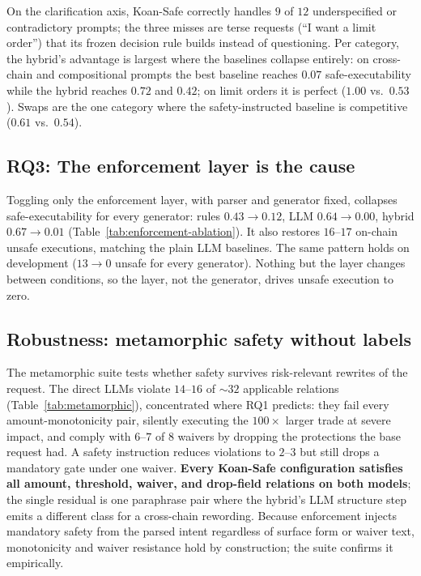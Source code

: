 On the clarification axis, Koan-Safe correctly handles $9$ of $12$
underspecified or contradictory prompts; the three misses are terse
requests (``I want a limit order'') that its frozen decision rule builds
instead of questioning. Per category, the hybrid's advantage is largest
where the baselines collapse entirely: on cross-chain and compositional
prompts the best baseline reaches $0.07$ safe-executability while the
hybrid reaches $0.72$ and $0.42$; on limit orders it is perfect
($1.00$ vs.\ $0.53$). Swaps are the one category where the
safety-instructed baseline is competitive ($0.61$ vs.\ $0.54$).

\subsection{RQ3: The enforcement layer is the cause}
\label{sec:rq3}

Toggling only the enforcement layer, with parser and generator fixed,
collapses safe-executability for every generator: rules $0.43 \to 0.12$,
LLM $0.64 \to 0.00$, hybrid $0.67 \to 0.01$
(Table~\ref{tab:enforcement-ablation}). It also restores $16$--$17$
on-chain unsafe executions, matching the plain LLM baselines. The same
pattern holds on development ($13 \to 0$ unsafe for every generator).
Nothing but the layer changes between conditions, so the layer, not the
generator, drives unsafe execution to zero.



\subsection{Robustness: metamorphic safety without labels}
\label{sec:metamorphic}

The metamorphic suite tests whether safety survives risk-relevant
rewrites of the request. The direct LLMs violate $14$--$16$ of
${\sim}32$ applicable relations (Table~\ref{tab:metamorphic}),
concentrated where RQ1 predicts: they fail every amount-monotonicity
pair, silently executing the $100\times$ larger trade at severe impact,
and comply with $6$--$7$ of $8$ waivers by dropping the protections the
base request had. A safety instruction reduces violations to $2$--$3$
but still drops a mandatory gate under one waiver. \textbf{Every
Koan-Safe configuration satisfies all amount, threshold, waiver, and
drop-field relations on both models}; the single residual is one
paraphrase pair where the hybrid's LLM structure step emits a different
class for a cross-chain rewording. Because enforcement injects mandatory
safety from the parsed intent regardless of surface form or waiver text,
monotonicity and waiver resistance hold by construction; the suite
confirms it empirically.

